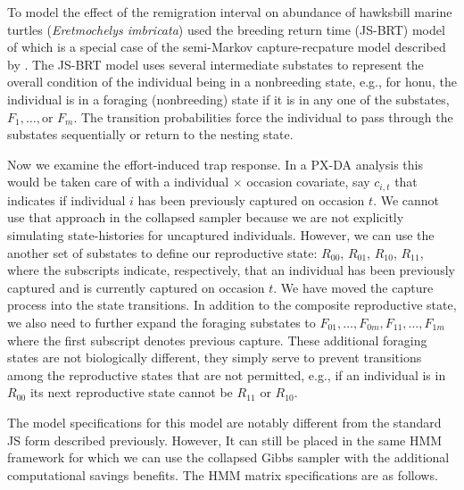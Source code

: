 \documentclass[11pt]{article}
\begin{document}
To model the effect of the remigration interval on abundance of hawksbill marine turtles ({\it Eretmochelys imbricata}) \citet{kendall2019multistate} used the breeding return time (JS-BRT) model of \cite{PledgerEtAl2013a} which is a special case of the semi-Markov capture-recpature model described by \cite{king2016semi}. The JS-BRT model uses several intermediate substates to represent the overall condition of the individual being in a nonbreeding state, e.g., for honu, the individual is in a foraging (nonbreeding) state if it is in any one of the substates, $F_1,\dots, \text{or } F_m$. The transition probabilities force the individual to pass through the substates sequentially or return to the nesting state. 

Now we examine the effort-induced trap response. In a PX-DA analysis this would be taken care of with a individual $\times$ occasion covariate, say $c_{i,t}$ that indicates if individual $i$ has been previously captured on occasion $t$. We cannot use that approach in the collapsed sampler because we are not explicitly simulating state-histories for uncaptured individuals. However, we can use the another set of substates to define our reproductive state: $R_{00}$, $R_{01}$, $R_{10}$, $R_{11}$, where the subscripts indicate, respectively, that an individual has been previously captured and is currently captured on occasion $t$. We have moved the capture process into the state transitions. In addition to the composite reproductive state, we also need to further expand the foraging substates to $F_{01},\dots,F_{0m},F_{11},\dots,F_{1m}$ where the first subscript denotes previous capture. These additional foraging states are not biologically different, they simply serve to prevent transitions among the reproductive states that are not permitted, e.g., if an individual is in $R_{00}$ its next reproductive state cannot be $R_{11}$ or $R_{10}$.

The model specifications for this model are notably different from the standard JS form described previously. However, It can still be placed in the same HMM framework for which we can use the collapsed Gibbs sampler with the additional computational savings benefits. The HMM matrix specifications are as follows.
\end{document}
